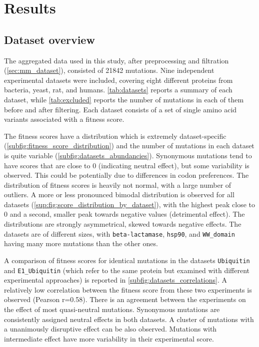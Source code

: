 \cleardoublepage%
\chapter{Results}

\section{Dataset overview}\label{sec:res_dataset}
The aggregated data used in this study, after preprocessing and filtration (\autoref{sec:mm_dataset}), consisted of \num{21842} mutations.
Nine independent experimental datasets were included, covering eight different proteins from bacteria, yeast, rat, and humans.
\autoref{tab:datasets} reports a summary of each dataset, while \autoref{tab:excluded} reports the number of mutations in each of them before and after filtering.
Each dataset consists of a set of single amino acid variants associated with a fitness score.

The fitness scores have a distribution which is extremely dataset-specific (\autoref{subfig:fitness_score_distribution}) and the number of mutations in each dataset is quite variable (\autoref{subfig:datasets_abundancies}).
Synonymous mutations tend to have scores that are close to \num{0} (indicating neutral effect), but some variability is observed.
This could be potentially due to differences in codon preferences.
The distribution of fitness scores is heavily not normal, with a large number of outliers.
A more or less pronounced bimodal distribution is observed for all datasets (\autoref{sup:fig:score_distribution_by_dataset}), with the highest peak close to \num{0} and a second, smaller peak towards negative values (detrimental effect).
The distributions are strongly asymmetrical, skewed towards negative effects.
The datasets are of different sizes, with \texttt{beta-lactamase}, \texttt{hsp90}, and \texttt{WW\_domain} having many more mutations than the other ones.

A comparison of fitness scores for identical mutations in the datasets \texttt{Ubiquitin} and \texttt{E1\_Ubiquitin} (which refer to the same protein but examined with different experimental approaches) is reported in \autoref{subfig:datasets_correlations}.
A relatively low correlation between the fitness score from these two experiments is observed (Pearson r=\num{0.58}).
There is an agreement between the experiments on the effect of most quasi-neutral mutations.
Synonymous mutations are consistently assigned neutral effects in both datasets.
A cluster of mutations with a unanimously disruptive effect can be also observed.
Mutations with intermediate effect have more variability in their experimental score.

